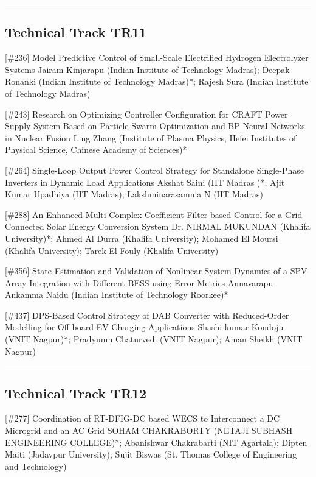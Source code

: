 \hrule  \subsection{Technical Track TR11}\nopagebreak {} \begin{abstract_online} {[\#236] Model Predictive Control of Small-Scale Electrified Hydrogen Electrolyzer Systems} {} {Jairam Kinjarapu (Indian Institute of Technology Madras); Deepak  Ronanki (Indian Institute of Technology Madras)*; Rajesh Sura (Indian Institute of Technology Madras)} {}  \end{abstract_online} 
{} \begin{abstract_online} {[\#243] Research on Optimizing Controller Configuration for CRAFT Power Supply System Based on Particle Swarm Optimization and BP Neural Networks in Nuclear Fusion} {} {Ling Zhang (Institute of Plasma Physics, Hefei Institutes of Physical Science, Chinese Academy of Sciences)*} {}  \end{abstract_online} 
{} \begin{abstract_online} {[\#264] Single-Loop Output Power Control Strategy for Standalone Single-Phase Inverters in Dynamic Load Applications} {} {Akshat Saini (IIT Madras )*; Ajit Kumar  Upadhiya (IIT Madras); Lakshminarasamma N  (IIT Madras)} {}  \end{abstract_online} 
{} \begin{abstract_online} {[\#288] An Enhanced Multi Complex Coefficient Filter based Control for a Grid Connected Solar Energy Conversion System} {} {Dr. NIRMAL MUKUNDAN (Khalifa University)*; Ahmed  Al Durra (Khalifa University); Mohamed  El Moursi (Khalifa University); Tarek  El Fouly (Khalifa University)} {}  \end{abstract_online} 
{} \begin{abstract_online} {[\#356] State Estimation and Validation of Nonlinear System Dynamics of a SPV Array Integration with Different BESS using Error Metrics} {} {Annavarapu Ankamma Naidu (Indian Institute of Technology Roorkee)*} {}  \end{abstract_online} 
{} \begin{abstract_online} {[\#437] DPS-Based Control Strategy of DAB Converter with Reduced-Order Modelling for Off-board EV Charging Applications} {} {Shashi kumar Kondoju (VNIT Nagpur)*; Pradyumn Chaturvedi (VNIT Nagpur); Aman Sheikh (VNIT Nagpur)} {}  \end{abstract_online} 
\hrule  \subsection{Technical Track TR12}\nopagebreak {} \begin{abstract_online} {[\#277] Coordination of RT-DFIG-DC based WECS to Interconnect a DC Microgrid and an AC Grid} {} {SOHAM CHAKRABORTY (NETAJI SUBHASH ENGINEERING COLLEGE)*; Abanishwar Chakrabarti (NIT Agartala); Dipten Maiti (Jadavpur University); Sujit Biswas (St. Thomas College of Engineering and Technology)} {}  \end{abstract_online} 
